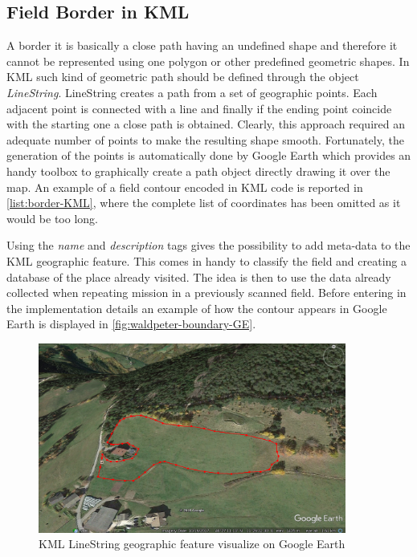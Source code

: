 
\subsection{Field Border in KML} %
\label{sub:field_border_in_kml}
A border it is basically a close path having an undefined shape and therefore it cannot be represented using one polygon or other predefined geometric shapes. In KML such kind of geometric path should be defined through the object \textit{LineString}. LineString creates a path from a set of geographic points. Each adjacent point is connected with a line and finally if the ending point coincide with the starting one a close path is obtained. Clearly, this approach required an adequate number of points to make the resulting shape smooth. Fortunately, the generation of the points is automatically done by Google Earth which provides an handy toolbox to graphically create a path object directly drawing it over the map.
An example of a field contour encoded in KML code is reported in \autoref{list:border-KML}, where the complete list of coordinates has been omitted as it would be too long.



Using the \textit{name} and \textit{description} tags gives the possibility to add meta-data to the KML geographic feature. This comes in handy to classify the field and creating a database of the place already visited. The idea is then to use the data already collected when repeating mission in a previously scanned field.
Before entering in the implementation details an example of how the contour appears in Google Earth is displayed in \autoref{fig:waldpeter-boundary-GE}.
\begin{figure}[ht]
    \centering
    \includegraphics[width=0.9\textwidth]{figures/C2/waldpeter-boundary-GE.png}
    \caption{KML LineString geographic feature visualize on Google Earth}
    \label{fig:waldpeter-boundary-GE}
\end{figure}

